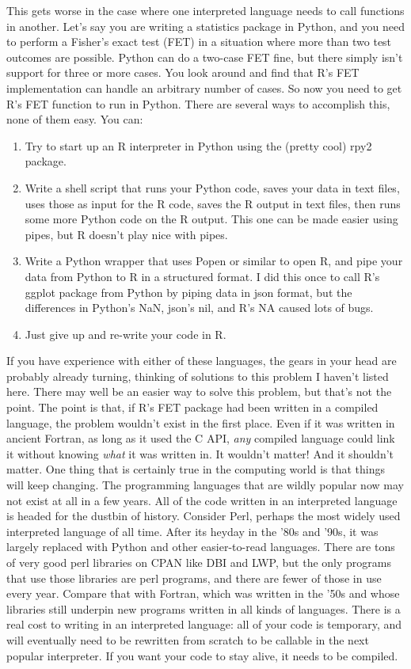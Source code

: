 \documentclass[12pt]{article}
\begin{document}
This gets worse in the case where one interpreted language needs to call
functions in another. Let's say you are writing a statistics package in Python,
and you need to perform a Fisher's exact test (FET) in a situation where more
than two test outcomes are possible. Python can do a two-case FET fine, but
there simply isn't support for three or more cases. You look around and find
that R's FET implementation can handle an arbitrary number of cases. So now you
need to get R's FET function to run in Python. There are several ways to
accomplish this, none of them easy. You can:

\begin{enumerate}
    \item Try to start up an R interpreter in Python using the (pretty cool) rpy2 package.
    \item Write a shell script that runs your Python code, saves your data in text files, uses those as input for the R code, saves the R output in text files, then runs some more Python code on the R output. This one can be made easier using pipes, but R doesn't play nice with pipes.
    \item Write a Python wrapper that uses Popen or similar to open R, and pipe your data from Python to R in a structured format. I did this once to call R's ggplot package from Python by piping data in json format, but the differences in Python's NaN, json's nil, and R's NA caused lots of bugs.
    \item Just give up and re-write your code in R.
\end{enumerate}

If you have experience with either of these languages, the gears in your head
are probably already turning, thinking of solutions to this problem I haven't
listed here. There may well be an easier way to solve this problem, but that's
not the point.  The point is that, if R's FET package had been written in a
compiled language, the problem wouldn't exist in the first place. Even if it
was written in ancient Fortran, as long as it used the C API, \textit{any}
compiled language could link it without knowing \textit{what} it was written
in. It wouldn't matter! And it shouldn't matter. One thing that is certainly
true in the computing world is that things will keep changing. The programming
languages that are wildly popular now may not exist at all in a few years. All
of the code written in an interpreted language is headed for the dustbin of
history. Consider Perl, perhaps the most widely used interpreted language of
all time.  After its heyday in the '80s and '90s, it was largely replaced with
Python and other easier-to-read languages. There are tons of very good perl
libraries on CPAN like DBI and LWP, but the only programs that use those
libraries are perl programs, and there are fewer of those in use every year.
Compare that with Fortran, which was written in the '50s and whose libraries
still underpin new programs written in all kinds of languages. There is a real
cost to writing in an interpreted language: all of your code is temporary,
and will eventually need to be rewritten from scratch to be callable in the next
popular interpreter. If you want your code to stay alive, it needs to be compiled.
\end{document}
